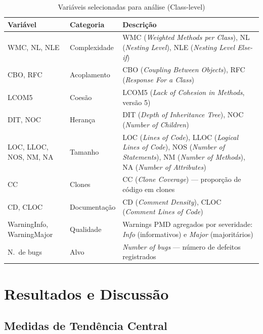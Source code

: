 \documentclass[12pt]{article}
\begin{document}
\begin{table}[H]
\centering
\caption{Variáveis selecionadas para análise (Class-level)}
\label{tab:selecao}
\footnotesize
\begin{tabular}{llp{7.5cm}}
\toprule
\textbf{Variável} & \textbf{Categoria} & \textbf{Descrição} \\
\midrule
WMC, NL, NLE             & Complexidade  & WMC (\textit{Weighted Methods per Class}), NL (\textit{Nesting Level}), NLE (\textit{Nesting Level Else-if}) \\
CBO, RFC                 & Acoplamento   & CBO (\textit{Coupling Between Objects}), RFC (\textit{Response For a Class}) \\
LCOM5                    & Coesão        & LCOM5 (\textit{Lack of Cohesion in Methods}, versão 5) \\
DIT, NOC                 & Herança       & DIT (\textit{Depth of Inheritance Tree}), NOC (\textit{Number of Children}) \\
LOC, LLOC, NOS, NM, NA   & Tamanho       & LOC (\textit{Lines of Code}), LLOC (\textit{Logical Lines of Code}), NOS (\textit{Number of Statements}), NM (\textit{Number of Methods}), NA (\textit{Number of Attributes}) \\
CC                       & Clones        & CC (\textit{Clone Coverage}) --- proporção de código em clones \\
CD, CLOC                 & Documentação  & CD (\textit{Comment Density}), CLOC (\textit{Comment Lines of Code}) \\
WarningInfo, WarningMajor & Qualidade    & Warnings PMD agregados por severidade: \textit{Info} (informativos) e \textit{Major} (majoritários) \\
N.\ de bugs              & Alvo          & \textit{Number of bugs} --- número de defeitos registrados \\
\bottomrule
\end{tabular}
\end{table}

\section{Resultados e Discussão} \label{sec:resultados}

\subsection{Medidas de Tendência Central}
\end{document}

